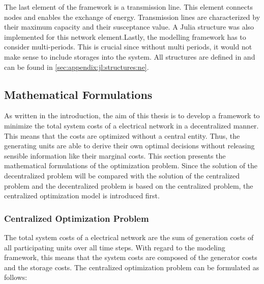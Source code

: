 The last element of the framework is a transmission line. This element connects nodes and enables the exchange of energy. Transmission lines are characterized by their maximum capacity and their susceptance value. A Julia structure was also implemented for this network element.Lastly, the modelling framework has to consider multi-periods. This is crucial since without multi periods, it would not make sense to include storages into the system. All structures are defined in  and can be found in \ref{sec:appendix:jl:structures:ne}.


\subsection{Mathematical Formulations}
\label{sec:app:math-form}

As written in the introduction, the aim of this thesis is to develop a framework to minimize the total system costs of a electrical network in a decentralized manner. This means that the costs are optimized without a central entity. Thus, the generating units are able to derive their own optimal decisions without releasing sensible information like their marginal costs. This section presents the mathematical formulations of the optimization problem. Since the solution of the decentralized problem will be compared with the solution of the centralized problem and the decentralized problem is based on the centralized problem, the centralized optimization model is introduced first.

\subsubsection{Centralized Optimization Problem}

The total system costs of a electrical network are the sum of generation costs of all participating units over all time steps. With regard to the modeling framework, this means that the system costs are composed of the generator costs and the storage costs. The centralized optimization problem can be formulated as follows:

